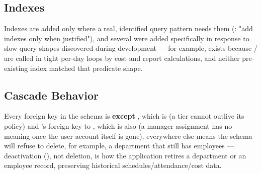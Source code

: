 \subsection*{Indexes}

Indexes are added only where a real, identified query pattern needs
them (: "add indexes only when
justified"), and several were added specifically in response to slow
query shapes discovered during development --- for example,
 exists
because \allowbreak/
are called in tight per-day loops by cost and report calculations, and
neither pre-existing index matched that predicate shape.

\subsection*{Cascade Behavior}

Every foreign key in the schema is 
\textbf{except} , which is
 (a tier cannot outlive its policy) and
's foreign key to , which is
also  (a manager assignment has no meaning once
the user account itself is gone).  everywhere else means
the schema will refuse to delete, for example, a department that still
has employees --- deactivation (), not
deletion, is how the application retires a department or an employee
record, preserving historical schedules/attendance/cost data.
